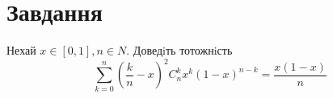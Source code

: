 
\chapter{Завдання \theHchapter}

\begin{tcolorbox}[title=Завдання]
    Нехай $x \in [0, 1], n \in N$. Доведiть тотожнiсть
    $$ \sum\limits_{k=0}^{n}(\frac{k}{n} - x)^2 C_n^kx^k(1-x)^{n-k}=
    \frac{x(1-x)}{n} $$
\end{tcolorbox}


